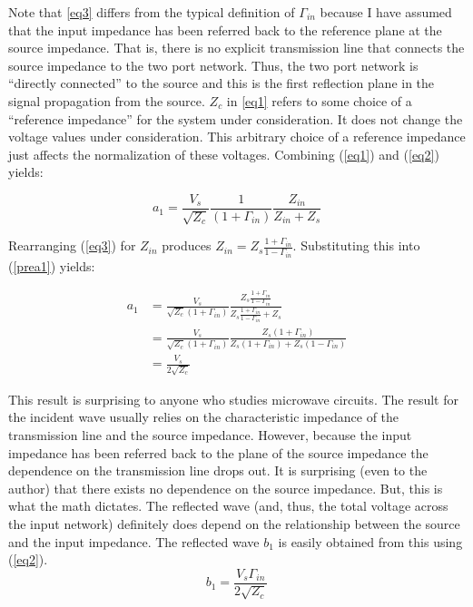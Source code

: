 Note that \ref{eq3} differs from the typical definition of $\Gamma_{in}$ because
I have assumed that the input impedance has been referred back to the reference
plane at the source impedance. That is, there is no explicit transmission line
that connects the source impedance to the two port network. Thus, the two port
network is ``directly connected'' to the source and this is the first reflection
plane in the signal propagation from the source. $Z_c$ in \ref{eq1} refers to
some choice of a ``reference impedance'' for the system under consideration. It
does not change the voltage values under consideration. This arbitrary choice
of a reference impedance just affects the normalization of these voltages.
Combining (\ref{eq1}) and (\ref{eq2}) yields:

\begin{equation}
    a_1 = \frac{V_s}{\sqrt{Z_c}} \frac{1}{( 1+\Gamma_{in} )}
    \frac{Z_{in}}{Z_{in}+Z_s} \label{prea1}
\end{equation}

Rearranging (\ref{eq3}) for $Z_{in}$ produces $Z_{in} = Z_s \frac{1+\Gamma_{ in
}}{1-\Gamma_{ in }}$. Substituting this into (\ref{prea1}) yields:

\begin{align}
    a_1 &= \frac{V_s}{\sqrt{Z_c}( 1+\Gamma_{in} )} \frac{Z_s \frac{1+\Gamma_{ in }}{1-\Gamma_{
    in }}}{Z_s \frac{1+\Gamma_{ in }}{1-\Gamma_{ in }} + Z_s} \nonumber \\
    &= \frac{V_s}{\sqrt{Z_c}( 1+\Gamma_{in} )} \frac{Z_s \left( 1+\Gamma_{in}
    \right)}{Z_s \left( 1+ \Gamma_{in} \right) + Z_s \left( 1 - \Gamma_{in}
    \right)} \nonumber \\
    &= \frac{V_s}{2 \sqrt{Z_c}} \label{a1}
\end{align}

This result is surprising to anyone who studies microwave circuits. The result
for the incident wave usually relies on the characteristic impedance of the
transmission line and the source impedance. However, because the input impedance
has been referred back to the plane of the source impedance the dependence on
the transmission line drops out. It is surprising (even to the author) that
there exists no dependence on the source impedance. But, this is what the math
dictates. The reflected wave (and, thus, the total voltage across the input network)
definitely does depend on the relationship between the source and the input
impedance. The reflected wave $b_1$ is easily obtained from this using
(\ref{eq2}). 
\begin{equation}        
    b_1 = \frac{V_s \Gamma_{in}}{2 \sqrt{Z_c}} \label{b1}
\end{equation}

